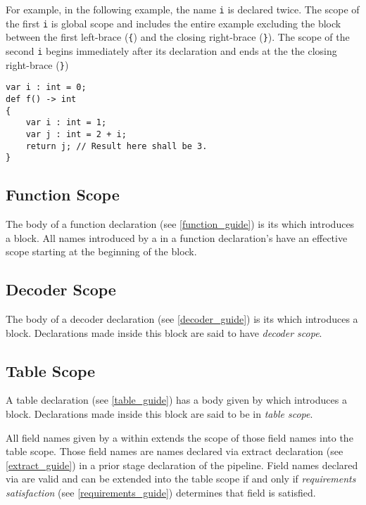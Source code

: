 For example, in the following example, the name \texttt{i} is declared twice. The scope of the first \texttt{i} is global scope and includes the entire example excluding the block between the first left-brace (\texttt{\{}) and the closing right-brace (\texttt{\}}). The scope of the second \texttt{i} begins immediately after its declaration and ends at the the closing right-brace (\texttt{\}})

\noindent\begin{minipage}{\linewidth}
\begin{lstlisting}
var i : int = 0;
def f() -> int
{
	var i : int = 1;
	var j : int = 2 + i;
	return j; // Result here shall be 3.
}
\end{lstlisting}
\end{minipage}

\subsection{Function Scope} \label{function_scope}

The body of a function declaration (see \ref{function_guide}) is its  which introduces a block. All names introduced by a  in a function declaration's  have an effective scope starting at the beginning of the block.

\subsection{Decoder Scope} \label{decoder_scope}

The body of a decoder declaration (see \ref{decoder_guide}) is its  which introduces a block. Declarations made inside this block are said to have \textit{decoder scope}.

\subsection{Table Scope} \label{table_scope}

A table declaration (see \ref{table_guide}) has a body given by  which introduces a block. Declarations made inside this block are said to be in \textit{table scope}.

All field names given by a  within  extends the scope of those field names into the table scope. Those field names are names declared via extract declaration (see \ref{extract_guide}) in a prior stage declaration of the pipeline. Field names declared via  are valid and can be extended into the table scope if and only if \textit{requirements satisfaction} (see \ref{requirements_guide}) determines that field is satisfied. 

